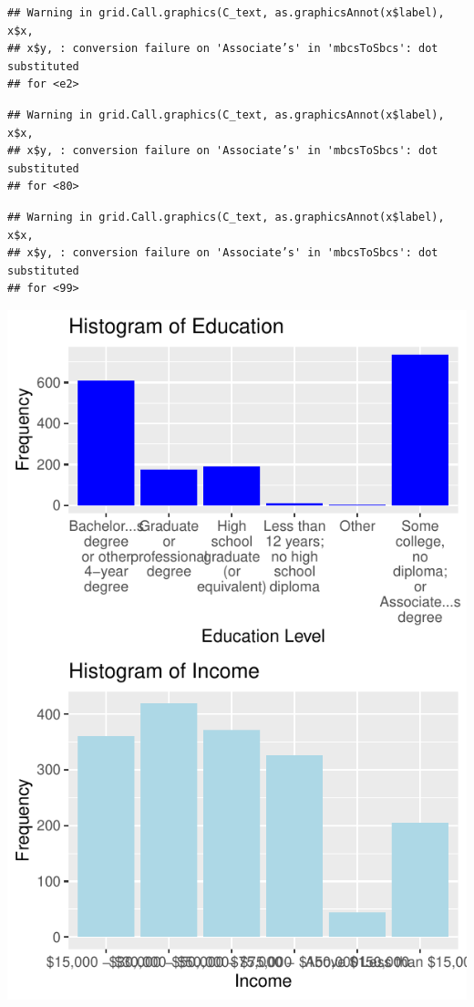 \documentclass[
]{article}
\begin{document}
\begin{verbatim}
## Warning in grid.Call.graphics(C_text, as.graphicsAnnot(x$label), x$x,
## x$y, : conversion failure on 'Associate’s' in 'mbcsToSbcs': dot substituted
## for <e2>
\end{verbatim}

\begin{verbatim}
## Warning in grid.Call.graphics(C_text, as.graphicsAnnot(x$label), x$x,
## x$y, : conversion failure on 'Associate’s' in 'mbcsToSbcs': dot substituted
## for <80>
\end{verbatim}

\begin{verbatim}
## Warning in grid.Call.graphics(C_text, as.graphicsAnnot(x$label), x$x,
## x$y, : conversion failure on 'Associate’s' in 'mbcsToSbcs': dot substituted
## for <99>
\end{verbatim}

\includegraphics{hw1_sp2022_files/figure-latex/unnamed-chunk-12-1.pdf}
\end{document}

